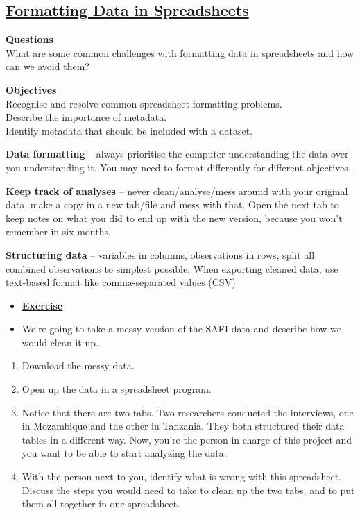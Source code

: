 \documentclass[12pt]{article}
\begin{document}
\subsection{\textbf{\href{https://datacarpentry.org/spreadsheets-socialsci/01-format-data/index.html}{Formatting Data in Spreadsheets}}}

\color{Gray}\textbf{{Questions}}
\\What are some common challenges with formatting data in spreadsheets and how can we avoid them?

\textbf{{Objectives}}
\\Recognise and resolve common spreadsheet formatting problems.
\\Describe the importance of metadata.
\\Identify metadata that should be included with a dataset.
\color{black}

\vspace{1em}
\textbf{Data formatting} – always prioritise the computer understanding the data over you understanding it. You may need to format differently for different objectives.

\textbf{Keep track of analyses} – never clean/analyse/mess around with your original data, make a copy in a new tab/file and mess with that. Open the next tab to keep notes on what you did to end up with the new version, because you won’t remember in six months.

\textbf{Structuring data} – variables in columns, observations in rows, split all combined observations to simplest possible. When exporting cleaned data, use text-based format like comma-separated values (CSV)

\newpage
\color{gray}
\begin{itemize}
\renewcommand{\labelitemi}{}
\item \textbf{\underline{Exercise}}
\item We’re going to take a messy version of the SAFI data and describe how we would clean it up.
\end{itemize}
\begin{enumerate}
    \item Download the messy data.
    \item Open up the data in a spreadsheet program.
    \item Notice that there are two tabs. Two researchers conducted the interviews, one in Mozambique and the other in Tanzania. They both structured their data tables in a different way. Now, you’re the person in charge of this project and you want to be able to start analyzing the data.
    \item With the person next to you, identify what is wrong with this spreadsheet. Discuss the steps you would need to take to clean up the two tabs, and to put them all together in one spreadsheet.
\end{enumerate}
\color{black}
\end{document}
